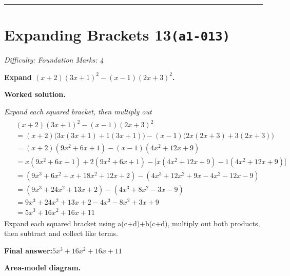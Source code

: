 \documentclass[11pt]{article}
\newcommand{\question}[1]{\par\medskip\noindent\textbf{#1}\par}
\begin{document}
\medskip\hrule

\section*{Expanding Brackets 13\quad\small\texttt{(a1-013)}}
\textit{Difficulty: Foundation \quad\textbar\quad Marks: 4}

\question{Expand \(  (x+2)(3x+1)^2 - (x-1)(2x+3)^2 \).}

\textbf{Worked solution.}

\textit{Expand each squared bracket, then multiply out}
\[\begin{gathered}
\begin{aligned} &(x+2)(3x+1)^2 - (x-1)(2x+3)^2 \\ &= (x+2)\Big(3x(3x+1)+1(3x+1)\Big) - (x-1)\Big(2x(2x+3)+3(2x+3)\Big) \\ &= (x+2)(9x^2+6x+1) - (x-1)(4x^2+12x+9) \\ &= x(9x^2+6x+1)+2(9x^2+6x+1) - \Big[x(4x^2+12x+9)-1(4x^2+12x+9)\Big] \\ &= (9x^3+6x^2+x+18x^2+12x+2) - (4x^3+12x^2+9x-4x^2-12x-9) \\ &= (9x^3+24x^2+13x+2) - (4x^3+8x^2-3x-9) \\ &= 9x^3+24x^2+13x+2-4x^3-8x^2+3x+9 \\ &= 5x^3+16x^2+16x+11 \end{aligned}
\end{gathered}\]
Expand each squared bracket using a(c+d)+b(c+d), multiply out both products, then subtract and collect like terms.

\begin{answerbox}
\textbf{Final answer:}\quad \(\displaystyle 5x^3+16x^2+16x+11\)
\end{answerbox}
\textbf{Area-model diagram.}
\end{document}
